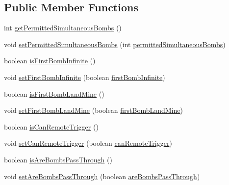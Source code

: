 \subsection*{Public Member Functions}
\begin{DoxyCompactItemize}
\item 
int \hyperlink{classbr_1_1unb_1_1unbomber_1_1component_1_1_bomb_dropper_a735bf9f42311d11be543445c445c4e74}{get\+Permitted\+Simultaneous\+Bombs} ()
\item 
void \hyperlink{classbr_1_1unb_1_1unbomber_1_1component_1_1_bomb_dropper_a12002448de78144381ac14937efe3f1f}{set\+Permitted\+Simultaneous\+Bombs} (int \hyperlink{classbr_1_1unb_1_1unbomber_1_1component_1_1_bomb_dropper_a69e0a914f0a36bac6ee0e17ad1d877c5}{permitted\+Simultaneous\+Bombs})
\item 
boolean \hyperlink{classbr_1_1unb_1_1unbomber_1_1component_1_1_bomb_dropper_ab0205483e58c4f014a896719dc732d1c}{is\+First\+Bomb\+Infinite} ()
\item 
void \hyperlink{classbr_1_1unb_1_1unbomber_1_1component_1_1_bomb_dropper_a34190198a74553ec10ec8e1684fb6f38}{set\+First\+Bomb\+Infinite} (boolean \hyperlink{classbr_1_1unb_1_1unbomber_1_1component_1_1_bomb_dropper_a4f457c4178392c5b1ac88e84e339bc23}{first\+Bomb\+Infinite})
\item 
boolean \hyperlink{classbr_1_1unb_1_1unbomber_1_1component_1_1_bomb_dropper_a7a34198d95a01419c83ec503e3e897ab}{is\+First\+Bomb\+Land\+Mine} ()
\item 
void \hyperlink{classbr_1_1unb_1_1unbomber_1_1component_1_1_bomb_dropper_a0c2382674e6a7716759e114b42ca9435}{set\+First\+Bomb\+Land\+Mine} (boolean \hyperlink{classbr_1_1unb_1_1unbomber_1_1component_1_1_bomb_dropper_ace7b7bfe607b23975b069ffec9efb105}{first\+Bomb\+Land\+Mine})
\item 
boolean \hyperlink{classbr_1_1unb_1_1unbomber_1_1component_1_1_bomb_dropper_a13115bd28c318e658caed10bda18be47}{is\+Can\+Remote\+Trigger} ()
\item 
void \hyperlink{classbr_1_1unb_1_1unbomber_1_1component_1_1_bomb_dropper_a1bbd696b02710d4c045a76e0bbc0f86f}{set\+Can\+Remote\+Trigger} (boolean \hyperlink{classbr_1_1unb_1_1unbomber_1_1component_1_1_bomb_dropper_ac5b6711b5ee70d27c401ebeff1cec914}{can\+Remote\+Trigger})
\item 
boolean \hyperlink{classbr_1_1unb_1_1unbomber_1_1component_1_1_bomb_dropper_a0ea96595070322eaa0a207c26018c7e5}{is\+Are\+Bombs\+Pass\+Through} ()
\item 
void \hyperlink{classbr_1_1unb_1_1unbomber_1_1component_1_1_bomb_dropper_afdc547a8cf5f93d8f98e8d1a37a1c8ae}{set\+Are\+Bombs\+Pass\+Through} (boolean \hyperlink{classbr_1_1unb_1_1unbomber_1_1component_1_1_bomb_dropper_ac85697fd5434f276d05378ec8c224e42}{are\+Bombs\+Pass\+Through})

\end{DoxyCompactItemize}
